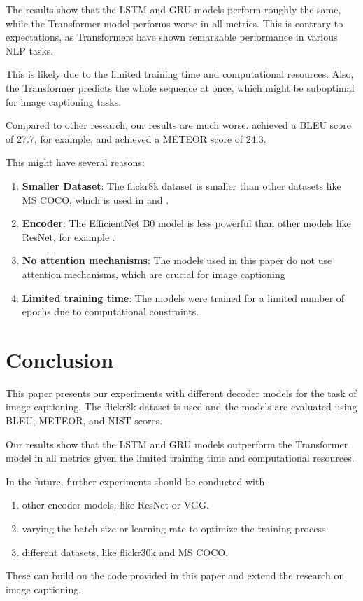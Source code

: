 \documentclass[12pt]{article}
\theoremstyle{plain}
\theoremstyle{definition}
\theoremstyle{remark}
\begin{document}
The results show that the LSTM and GRU models perform roughly the same, while the Transformer model performs worse in all metrics. This is contrary to expectations, as Transformers have shown remarkable performance in various NLP tasks.
\par This is likely due to the limited training time and computational resources. Also, the Transformer predicts the whole sequence at once, which might be suboptimal for image captioning tasks.
\par Compared to other research, our results are much worse. \cite{vinyals2015show} achieved a BLEU score of  27.7, for example, and \cite{xu2015show} achieved a METEOR score of 24.3.
\par This might have several reasons: \begin{enumerate}
    \item \textbf{Smaller Dataset}: The flickr8k dataset is smaller than other datasets like MS COCO, which is used in \cite{vinyals2015show} and \cite{xu2015show}.
    \item \textbf{Encoder}: The EfficientNet B0 model is less powerful than other models like ResNet, for example \cite{he2016deep}.
    \item \textbf{No attention mechanisms}: The models used in this paper do not use attention mechanisms, which are crucial for image captioning \cite{xu2015show}
    \item \textbf{Limited training time}: The models were trained for a limited number of epochs due to computational constraints.
\end{enumerate}



\section{Conclusion}\label{sec:conclusion}

This paper presents our experiments with different decoder models for the task of image captioning. The flickr8k dataset is used and the models are evaluated using BLEU, METEOR, and NIST scores.
\par Our results show that the LSTM and GRU models outperform the Transformer model in all metrics given the limited training time and computational resources.
\par In the future, further experiments should be conducted with
\begin{enumerate}
    \item other encoder models, like ResNet or VGG.
    \item varying the batch size or learning rate to optimize the training process.
    \item different datasets, like flickr30k and MS COCO.
\end{enumerate}
These can build on the code provided in this paper and extend the research on image captioning.



\newpage
\thispagestyle{empty}

\fontsize{12}{14}\selectfont


\end{document}
